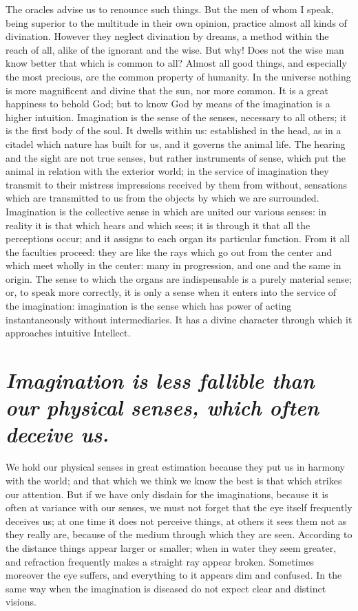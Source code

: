 \documentclass[12pt]{article}
\begin{document}
\noindent The oracles advise us to renounce such things. But the men of whom I
speak, being superior to the multitude in their own opinion, practice almost
all kinds of divination. However they neglect divination by dreams, a method
within the reach of all, alike of the ignorant and the wise. But why! Does not
the wise man know better that which is common to all? Almost all good things,
and especially the most precious, are the common property of humanity. In the
universe nothing is more magnificent and divine that the sun, nor more common.
It is a great happiness to behold God; but to know God by means of the
imagination is a higher intuition. Imagination is the sense of the senses,
necessary to all others; it is the first body of the soul. It dwells within us:
established in the head, as in a citadel which nature has built for us, and it
governs the animal life. The hearing and the sight are not true senses, but
rather instruments of sense, which put the animal in relation with the exterior
world; in the service of imagination they transmit to their mistress
impressions received by them from without, sensations which are transmitted to
us from the objects by which we are surrounded. Imagination is the collective
sense in which are united our various senses: in reality it is that which hears
and which sees; it is through it that all the perceptions occur; and it assigns
to each organ its particular function. From it all the faculties proceed: they
are like the rays which go out from the center and which meet wholly in the
center: many in progression, and one and the same in origin. The sense to which
the organs are indispensable is a purely material sense; or, to speak more
correctly, it is only a sense when it enters into the service of the
imagination: imagination is the sense which has power of acting instantaneously
without intermediaries. It has a divine character through which it approaches
intuitive Intellect.


\section{\mdseries\itshape Imagination is less fallible than our physical
senses, which often deceive us.}

We hold our physical senses in great estimation because they put us in harmony
with the world; and that which we think we know the best is that which strikes
our attention. But if we have only disdain for the imaginations, because it is
often at variance with our senses, we must not forget that the eye itself
frequently deceives us; at one time it does not perceive things, at others it
sees them not as they really are, because of the medium through which they are
seen. According to the distance things appear larger or smaller; when in water
they seem greater, and refraction frequently makes a straight ray appear
broken. Sometimes moreover the eye suffers, and everything to it appears dim
and confused. In the same way when the imagination is diseased do not expect
clear and distinct visions.
\end{document}
